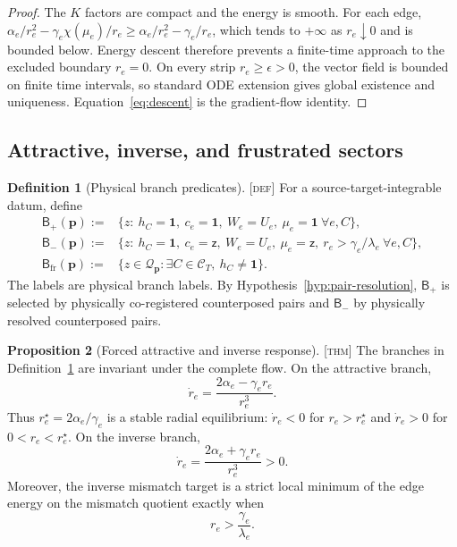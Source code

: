 \documentclass[11pt]{article}
\newcommand{\Id}{\ensuremath{\mathbf 1}}
\newcommand{\zinv}{\ensuremath{\mathsf z}}
\newcommand{\State}{\ensuremath{\mathcal Q}}
\newcommand{\Branch}{\ensuremath{\mathsf B}}
\newcommand{\Defn}{\textsc{[def]}}
\newcommand{\Thm}{\textsc{[thm]}}
\theoremstyle{definition}
\newtheorem{definition}{Definition}[section]
\newtheorem{proposition}[definition]{Proposition}
\begin{document}
\begin{proof}
The $K$ factors are compact and the energy is smooth.  For each edge,
$\alpha_e/r_e^2-\gamma_e\chi(\mu_e)/r_e\ge
\alpha_e/r_e^2-\gamma_e/r_e$, which tends to $+\infty$ as $r_e\downarrow0$
and is bounded below.  Energy descent therefore prevents a finite-time approach
to the excluded boundary $r_e=0$.  On every strip $r_e\ge\epsilon>0$, the
vector field is bounded on finite time intervals, so standard ODE extension gives
global existence and uniqueness.  Equation~\eqref{eq:descent} is the gradient-flow
identity.
\end{proof}

\subsection{Attractive, inverse, and frustrated sectors}

\begin{definition}[Physical branch predicates]
\label{def:branches}
\Defn{} For a source-target-integrable datum, define
\begin{align}
\Branch_+(\mathbf p):={}&\{z:\ h_C=\Id,\ c_e=\Id,\ W_e=U_e,
\ \mu_e=\Id\ \forall e,C\},
\label{eq:bplus}\\
\Branch_-(\mathbf p):={}&\{z:\ h_C=\Id,\ c_e=\zinv,\ W_e=U_e,
\ \mu_e=\zinv,\ r_e>\gamma_e/\lambda_e\ \forall e,C\},
\label{eq:bminus}\\
\Branch_{\mathrm{fr}}(\mathbf p):={}&\{z\in\State_{\mathbf p}:\exists C\in\mathcal C_T,
\ h_C\ne\Id\}.
\label{eq:bfr}
\end{align}
The labels are physical branch labels.  By Hypothesis~\ref{hyp:pair-resolution},
$\Branch_+$ is selected by physically co-registered counterposed pairs and
$\Branch_-$ by physically resolved counterposed pairs.
\end{definition}

\begin{proposition}[Forced attractive and inverse response]
\label{prop:response}
\Thm{} The branches in Definition~\ref{def:branches} are invariant under the
complete flow.  On the attractive branch,
\begin{equation}
\dot r_e=\frac{2\alpha_e-\gamma_er_e}{r_e^3}.
\label{eq:attractive-response}
\end{equation}
Thus $r_e^\star=2\alpha_e/\gamma_e$ is a stable radial equilibrium: $\dot r_e<0$
for $r_e>r_e^\star$ and $\dot r_e>0$ for $0<r_e<r_e^\star$.  On the inverse
branch,
\begin{equation}
\dot r_e=\frac{2\alpha_e+\gamma_er_e}{r_e^3}>0.
\label{eq:inverse-response}
\end{equation}
Moreover, the inverse mismatch target is a strict local minimum of the
edge energy on the mismatch quotient exactly when
\begin{equation}
r_e>\frac{\gamma_e}{\lambda_e}.
\label{eq:inverse-stability}
\end{equation}
\end{proposition}
\end{document}
